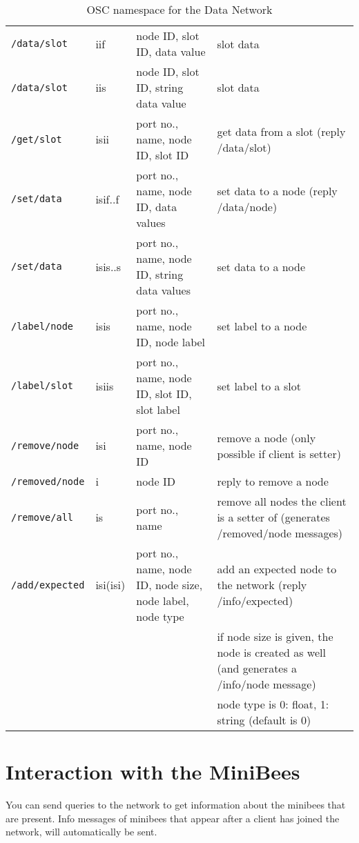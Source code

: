 \documentclass[letterpaper,10pt]{article}
\begin{document}
\begin{table}
\begin{center}
\begin{tabular}{|llll|}
\verb|/data/slot| & iif & node ID, slot ID, data value & slot data \\
\verb|/data/slot| & iis & node ID, slot ID, string data value & slot data \\
\verb|/get/slot| & isii & port no., name, node ID, slot ID & get data from a slot (reply /data/slot) \\

\verb|/set/data| & isif..f & port no., name, node ID, data values & set data to a node (reply /data/node)\\
\verb|/set/data| & isis..s & port no., name, node ID, string data values & set data to a node\\

\verb|/label/node| & isis & port no., name, node ID, node label & set label to a node \\
\verb|/label/slot| & isiis & port no., name, node ID, slot ID, slot label & set label to a slot \\

\verb|/remove/node| & isi & port no., name, node ID & remove a node (only possible if client is setter) \\
\verb|/removed/node| & i & node ID & reply to remove a node \\
\verb|/remove/all| & is & port no., name & remove all nodes the client is a setter of (generates /removed/node messages) \\

\verb|/add/expected| & isi(isi) & port no., name, node ID, node size, node label, node type & add an expected node to the network (reply /info/expected) \\
 &  &  & if node size is given, the node is created as well (and generates a /info/node message) \\
 &  &  & node type is 0: float, 1: string (default is 0) \\
\hline
\end{tabular}
\end{center}
\caption{OSC namespace for the Data Network}
\label{oscinterface}
\end{table}

\section{Interaction with the MiniBees}

You can send queries to the network to get information about the minibees that are present. Info messages of minibees that appear after a client has joined the network, will automatically be sent.
\end{document}
